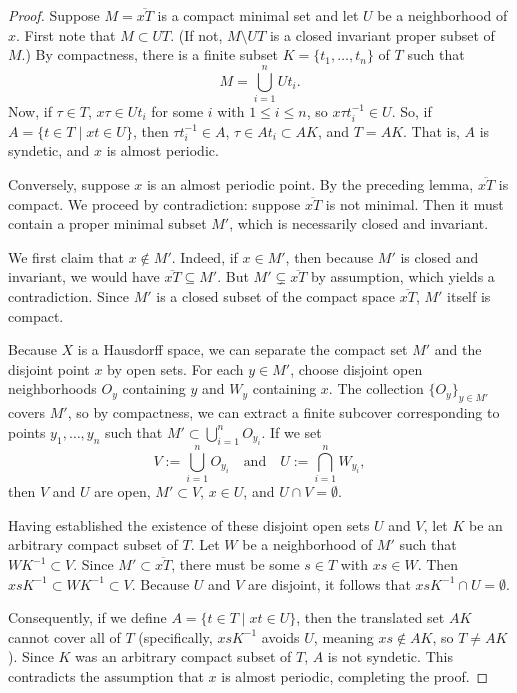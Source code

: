 \begin{proof}
    Suppose $M = \overline{xT}$ is a compact minimal set and let $U$ be a neighborhood of $x$. First note that $M \subset UT$. (If not, $M \setminus UT$ is a closed invariant proper subset of $M$.) By compactness, there is a finite subset $K = \{t_1, \ldots, t_n\}$ of $T$ such that
    $$
        M = \bigcup_{i=1}^{n} Ut_i.
    $$
    Now, if $\tau \in T$, $x\tau \in Ut_i$ for some $i$ with $1 \le i \le n$, so $x\tau t_i^{-1} \in U$. So, if $A = \{t \in T \mid xt \in U\}$, then $\tau t_i^{-1} \in A$, $\tau \in At_i \subset AK$, and $T = AK$. That is, $A$ is syndetic, and $x$ is almost periodic.

    Conversely, suppose $x$ is an almost periodic point. By the preceding lemma, $\overline{xT}$ is compact. We proceed by contradiction: suppose $\overline{xT}$ is not minimal. Then it must contain a proper minimal subset $M'$, which is necessarily closed and invariant.

    We first claim that $x \notin M'$. Indeed, if $x \in M'$, then because $M'$ is closed and invariant, we would have $\overline{xT} \subseteq M'$. But $M' \subsetneq \overline{xT}$ by assumption, which yields a contradiction. Since $M'$ is a closed subset of the compact space $\overline{xT}$, $M'$ itself is compact.

    Because $X$ is a Hausdorff space, we can separate the compact set $M'$ and the disjoint point $x$ by open sets. For each $y \in M'$, choose disjoint open neighborhoods $O_y$ containing $y$ and $W_y$ containing $x$. The collection $\{O_y\}_{y \in M'}$ covers $M'$, so by compactness, we can extract a finite subcover corresponding to points $y_1, \dots, y_n$ such that $M' \subset \bigcup_{i=1}^n O_{y_i}$. If we set
    $$
        V := \bigcup_{i=1}^n O_{y_i} \quad \text{and} \quad U := \bigcap_{i=1}^n W_{y_i},
    $$
    then $V$ and $U$ are open, $M' \subset V$, $x \in U$, and $U \cap V = \emptyset$.

    Having established the existence of these disjoint open sets $U$ and $V$, let $K$ be an arbitrary compact subset of $T$. Let $W$ be a neighborhood of $M'$ such that $WK^{-1} \subset V$. Since $M' \subset \overline{xT}$, there must be some $s \in T$ with $xs \in W$. Then $xsK^{-1} \subset WK^{-1} \subset V$. Because $U$ and $V$ are disjoint, it follows that $xsK^{-1} \cap U = \emptyset$.

    Consequently, if we define $A = \{t \in T \mid xt \in U\}$, then the translated set $AK$ cannot cover all of $T$ (specifically, $xsK^{-1}$ avoids $U$, meaning $xs \notin AK$, so $T \ne AK$). Since $K$ was an arbitrary compact subset of $T$, $A$ is not syndetic. This contradicts the assumption that $x$ is almost periodic, completing the proof.
\end{proof}


